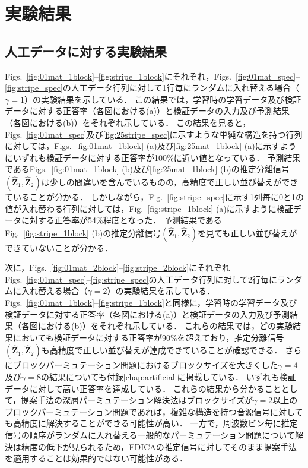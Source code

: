 \section{実験結果}
\label{sec:ex_res}
\subsection{人工データに対する実験結果}
\label{sec:ex_res_artificial}

Figs.~\ref{fig:01mat_1block}--\ref{fig:stripe_1block}にそれぞれ，Figs.~\ref{fig:01mat_spec}--\ref{fig:stripe_spec}の人工データ行列に対して1行毎にランダムに入れ替える場合（$\gamma=1$）の実験結果を示している．
この結果では，学習時の学習データ及び検証データに対する正答率（各図における(a)）と検証データの入力及び予測結果（各図における(b)）をそれぞれ示している．
この結果を見ると，Figs.~\ref{fig:01mat_spec}及び\ref{fig:25stripe_spec}に示すような単純な構造を持つ行列に対しては，Figs.~\ref{fig:01mat_1block} (a)及び\ref{fig:25mat_1block} (a)に示すようにいずれも検証データに対する正答率が100\%に近い値となっている．
予測結果であるFigs.~\ref{fig:01mat_1block} (b)及び\ref{fig:25mat_1block} (b)の推定分離信号$(\hat{\bm{Z}}_1, \hat{\bm{Z}}_2)$は少しの間違いを含んでいるものの，高精度で正しい並び替えができていることが分かる．
しかしながら，Fig.~\ref{fig:stripe_spec}に示す1列毎に0と1の値が入れ替わる行列に対しては，Fig.~\ref{fig:stripe_1block} (a)に示すように検証データに対する正答率が54\%程度となった．
予測結果であるFig.~\ref{fig:stripe_1block} (b)の推定分離信号$(\hat{\bm{Z}}_1, \hat{\bm{Z}}_2)$を見ても正しい並び替えができていないことが分かる．

次に，Figs.~\ref{fig:01mat_2block}--\ref{fig:stripe_2block}にそれぞれFigs.~\ref{fig:01mat_spec}--\ref{fig:stripe_spec}の人工データ行列に対して2行毎にランダムに入れ替える場合（$\gamma=2$）の実験結果を示している．
Figs.~\ref{fig:01mat_1block}--\ref{fig:stripe_1block}と同様に，学習時の学習データ及び検証データに対する正答率（各図における(a)）と検証データの入力及び予測結果（各図における(b)）をそれぞれ示している．
これらの結果では，どの実験結果においても検証データに対する正答率が90\%を超えており，推定分離信号$(\hat{\bm{Z}}_1, \hat{\bm{Z}}_2)$も高精度で正しい並び替えが達成できていることが確認できる．
さらにブロックパーミュテーション問題におけるブロックサイズを大きくした$\gamma=4$及び$\gamma=8$の結果についても付録\ref{chap:artificial}に掲載している．
いずれも検証データに対して高い正答率を達成している．
これらの結果から分かることとして，提案手法の深層パーミュテーション解決法はブロックサイズが$\gamma=2$以上のブロックパーミュテーション問題であれば，複雑な構造を持つ音源信号に対しても高精度に解決することができる可能性が高い．
一方で，周波数ビン毎に推定信号の順序がランダムに入れ替える一般的なパーミュテーション問題について解決は精度の低下が見られるため，FDICAの推定信号に対してそのまま提案手法を適用することは効果的ではない可能性がある．

